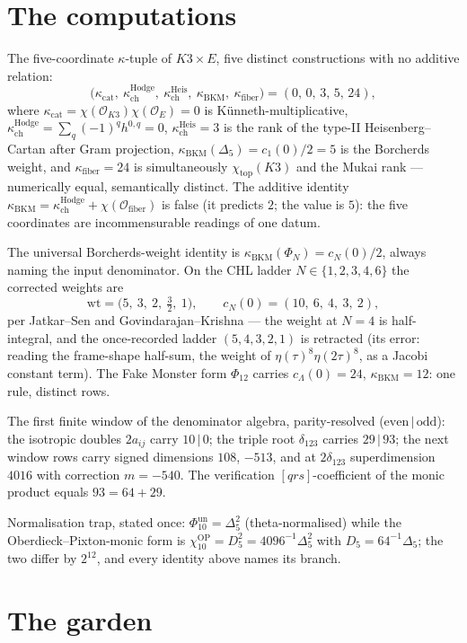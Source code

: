 \documentclass[11pt]{article}
\providecommand{\cO}{\mathcal{O}}
\providecommand{\kch}{\kappa_{\mathrm{ch}}}
\providecommand{\kBKM}{\kappa_{\mathrm{BKM}}}
\providecommand{\kcat}{\kappa_{\mathrm{cat}}}
\providecommand{\kfib}{\kappa_{\mathrm{fiber}}}
\providecommand{\Dfive}{\Delta_5}
\providecommand{\Phiten}{\Phi_{10}}
\begin{document}
\section{The computations}\label{sec:computations}

The five-coordinate $\kappa$-tuple of $K3\times E$, five distinct
constructions with no additive relation:
\[
\bigl(\kcat,\ \kch^{\mathrm{Hodge}},\ \kch^{\mathrm{Heis}},\
\kBKM,\ \kfib\bigr)=(0,\,0,\,3,\,5,\,24),
\]
where $\kcat=\chi(\cO_{K3})\chi(\cO_E)=0$ is K\"unneth-multiplicative,
$\kch^{\mathrm{Hodge}}=\sum_q(-1)^qh^{0,q}=0$,
$\kch^{\mathrm{Heis}}=3$ is the rank of the type-II Heisenberg--Cartan
after Gram projection, $\kBKM(\Dfive)=c_1(0)/2=5$ is the Borcherds
weight, and $\kfib=24$ is simultaneously $\chi_{\mathrm{top}}(K3)$ and
the Mukai rank --- numerically equal, semantically distinct. The
additive identity
$\kBKM=\kch^{\mathrm{Hodge}}+\chi(\cO_{\mathrm{fiber}})$ is false
\textup{(it predicts $2$; the value is $5$)}: the five coordinates are
incommensurable readings of one datum.

The universal Borcherds-weight identity is
$\kBKM(\Phi_N)=c_N(0)/2$, always naming the input denominator. On the
CHL ladder $N\in\{1,2,3,4,6\}$ the corrected weights are
\[
\mathrm{wt}=\bigl(5,\ 3,\ 2,\ \tfrac32,\ 1\bigr),
\qquad c_N(0)=(10,\ 6,\ 4,\ 3,\ 2),
\]
per Jatkar--Sen and Govindarajan--Krishna --- the weight at $N=4$ is
half-integral, and the once-recorded ladder $(5,4,3,2,1)$ is
retracted \textup{(its error: reading the frame-shape half-sum, the
weight of $\eta(\tau)^8\eta(2\tau)^8$, as a Jacobi constant term)}.
The Fake Monster form $\Phi_{12}$ carries $c_\Lambda(0)=24$,
$\kBKM=12$: one rule, distinct rows.

The first finite window of the denominator algebra, parity-resolved
($\mathrm{even}\,|\,\mathrm{odd}$): the isotropic doubles $2a_{ij}$
carry $10\,|\,0$; the triple root $\delta_{123}$ carries $29\,|\,93$;
the next window rows carry signed dimensions
$108$, $-513$, and at $2\delta_{123}$ superdimension $4016$ with
correction $m=-540$. The verification $[qrs]$-coefficient of the
monic product equals $93=64+29$.

Normalisation trap, stated once: $\Phiten^{\mathrm{un}}=\Dfive^2$
\textup{(theta-normalised)} while the Oberdieck--Pixton-monic form is
$\chi_{10}^{\mathrm{OP}}=D_5^2=4096^{-1}\Dfive^2$ with
$D_5=64^{-1}\Dfive$; the two differ by $2^{12}$, and every identity
above names its branch.

\section{The garden}\label{sec:garden}
\end{document}
